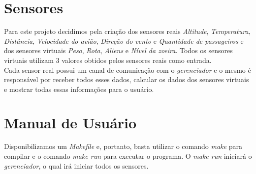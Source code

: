 \documentclass[10pt,a4paper]{article}
\begin{document}
\section{Sensores}
Para este projeto decidimos pela criação dos sensores reais \textit{Altitude}, \textit{Temperatura}, \textit{Distância}, \textit{Velocidade do avião}, \textit{Direção do vento} e \textit{Quantidade de passageiros} e dos sensores virtuais \textit{Peso}, \textit{Rota}, \textit{Aliens} e \textit{Nível da zoeira}. Todos os sensores virtuais utilizam 3 valores obtidos pelos sensores reais como entrada.\\
Cada sensor real possui um canal de comunicação com o \textit{gerenciador} e o mesmo é responsável por receber todos esses dados, calcular os dados dos sensores virtuais e mostrar todas essas informações para o usuário.
\section{Manual de Usuário}
Disponibilizamos um \textit{Makefile} e, portanto, basta utilizar o comando \textit{make} para compilar e o comando \textit{make run} para executar o programa. O \textit{make run} iniciará o \textit{gerenciador}, o qual irá iniciar todos os sensores.
\end{document}
